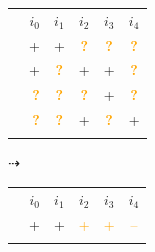 \begin{figure}[H]
    \centering
    \begin{subfigure}[c]{0.4\textwidth}
        \centering
        \resizebox{\columnwidth}{!} {
            \centering
            \renewcommand{\arraystretch}{1.2}
            \begin{tabular}{cc|c|c|c|c|}
                \multicolumn{1}{c||}{} &\multicolumn{1}{r|}{$i_0$} & $i_1$ & $i_2$ & $i_3$ & $i_4$ \\
                \hhline{=::=====}
                \multicolumn{1}{c||}{$u_0$} & \multicolumn{1}{r|}{+} & + & \textcolor{orange}{\textbf{?}} & \textcolor{orange}{\textbf{?}} & \textcolor{orange}{\textbf{?}} \\
                \hhline{-||-----}
                \multicolumn{1}{c||}{$u_1$} & \multicolumn{1}{r|}{+} & \textcolor{orange}{\textbf{?}} & + & + & \textcolor{orange}{\textbf{?}} \\
                \hhline{-||-----}
                \multicolumn{1}{c||}{$u_2$} & \multicolumn{1}{r|}{\textcolor{orange}{\textbf{?}}} & \textcolor{orange}{\textbf{?}} & \textcolor{orange}{\textbf{?}} & + & \textcolor{orange}{\textbf{?}} \\
                \hhline{-||-----}
                \multicolumn{1}{c||}{$u_3$} & \multicolumn{1}{r|}{\textcolor{orange}{\textbf{?}}} & \textcolor{orange}{\textbf{?}} & + & \textcolor{orange}{\textbf{?}} & + \\
                \hhline{-||-----}
            \end{tabular}
        }
        \label{subfig:raw-data}
    \end{subfigure}
    \begin{subfigure}[c]{0.15\textwidth}
        \centering
        \Large$\dashrightarrow$
    \end{subfigure}
    \begin{subfigure}[c]{0.4\textwidth}
        \centering
        \resizebox{\columnwidth}{!} {
            \centering
            \renewcommand{\arraystretch}{1.2}
            \begin{tabular}{cc|c|c|c|c|}
                \multicolumn{1}{c||}{} &\multicolumn{1}{r|}{$i_0$} & $i_1$ & $i_2$ & $i_3$ & $i_4$ \\
                \hhline{=::=====}
                \multicolumn{1}{c||}{$u_0$} & \multicolumn{1}{r|}{+} & + & \textcolor{orange}{+} & \textcolor{orange}{+} & \textcolor{orange}{--} \\
                \hhline{-||-----}

\end{tabular}}
\end{subfigure}
\end{figure}
